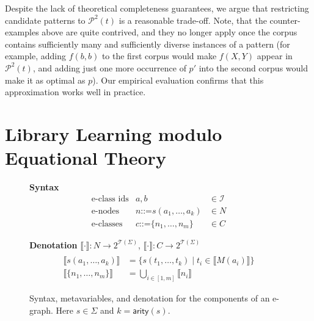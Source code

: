 \documentclass[acmsmall,screen,nonacm,review=false,timestamp=false]{acmart}
\newcommand{\arity}{\mathsf{arity}}
\newcommand{\termsof}[1]{\mathcal{T}(#1)}
\newcommand{\plau}[1]{\mathcal{P}^2(#1)}
\newcommand{\denot}[1]{\llbracket #1 \rrbracket}
\newcommand{\gramdef}{\ensuremath{\mathrel{\mathord{:}\mathord{:=}}}}
\begin{document}
Despite the lack of theoretical completeness guarantees, 
we argue that restricting candidate patterns to $\plau{t}$ is a reasonable trade-off.
Note, that the counter-examples above are quite contrived,
and they no longer apply once the corpus contains sufficiently many and sufficiently diverse instances of a pattern
(for example, adding $f(b,b)$ to the first corpus would make $f(X,Y)$ appear in $\plau{t}$,
and adding just one more occurrence of $p'$ into the second corpus would make it as optimal as $p$).
Our empirical evaluation confirms that this approximation works well in practice.





















 \section{Library Learning modulo Equational Theory}\label{sec:egraphs}

\begin{figure}
  \begin{minipage}{.5\textwidth}
    \textbf{Syntax}
    $$
    \begin{array}{rll}
      \text{e-class ids} & a,b &\in \mathcal{I} \\
      \text{e-nodes}     & n \gramdef s(a_1, \ldots, a_k)  &\in N\\
      \text{e-classes}   & c \gramdef \{n_1, \ldots, n_m\} &\in C     
    \end{array}
    $$      
  \end{minipage}\begin{minipage}{.5\textwidth}
    \textbf{Denotation} $\denot{\cdot}\colon N\to 2^{\termsof{\Sigma}}$, $\denot{\cdot}\colon C\to 2^{\termsof{\Sigma}}$
    $$
    \begin{array}{rl}
      \\
      \denot{s(a_1, \ldots, a_k)} &= \{s(t_1, \ldots, t_k) \mid t_i \in \denot{M(a_i)}\}\\
      \denot{\{n_1, \ldots, n_m\}} &= \bigcup_{i \in [1,m]} \denot{n_i}
    \end{array}
    $$      
  \end{minipage}
  \caption{Syntax, metavariables, and denotation for the components of an e-graph.
           Here $s \in \Sigma$ and $k = \arity(s)$.}\label{fig:syntax}
\end{figure}
\end{document}
